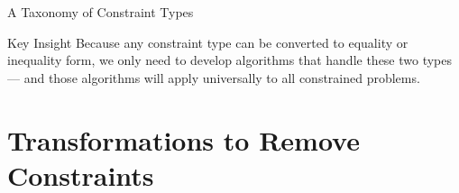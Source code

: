 \documentclass[aspectratio=169,10pt]{beamer}
\begin{document}
\begin{frame}[allowframebreaks]{A Taxonomy of Constraint Types}
  \vspace{10pt}

  \begin{alertblock}{Key Insight}
    Because any constraint type can be converted to equality or inequality form,
    we only need to develop algorithms that handle these two types --- and those
    algorithms will apply universally to all constrained problems.
  \end{alertblock}

\end{frame}

\section{Transformations to Remove Constraints}
\end{document}
